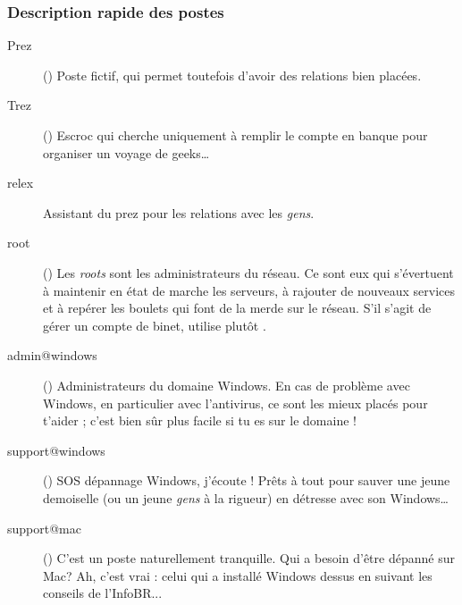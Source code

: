 





\subsubsection*{Description rapide des postes}

\begin{description}

  \item[Prez]{() Poste fictif, qui permet toutefois d'avoir
des relations bien plac\'ees.}

  \item[Trez]{() Escroc qui cherche uniquement \`a remplir le compte en banque pour organiser un voyage de geeks\dots}

  \item[relex]{Assistant du prez pour les relations avec les \emph{gens}.}

  \item[root]{() Les \emph{roots} sont les administrateurs du r\'eseau. Ce sont eux qui s'\'evertuent \`a maintenir en \'etat de marche les serveurs, \`a rajouter de nouveaux services et \`a rep\'erer les boulets qui font de la merde sur le r\'eseau. S'il s'agit de g\'erer un compte de binet, utilise plut\^ot .}

  \item[admin@windows] {() Administrateurs du domaine Windows. En cas de probl\`eme avec Windows, en particulier avec l'antivirus, ce sont les mieux plac\'es pour t'aider ; c'est bien s\^ur  plus facile si tu es sur le domaine !
}
  \item[support@windows] {() SOS d\'epannage Windows, j'\'ecoute ! Pr\^ets \`a tout pour sauver une jeune demoiselle (ou un jeune \emph{gens} \`a la rigueur) en d\'etresse avec son Windows\dots }

  \item[support@mac] {() C'est un poste naturellement tranquille. Qui a besoin d'\^etre d\'epann\'e sur Mac? Ah, c'est vrai : celui qui a install\'e Windows dessus en suivant les conseils de l'InfoBR... }


\end{description}
